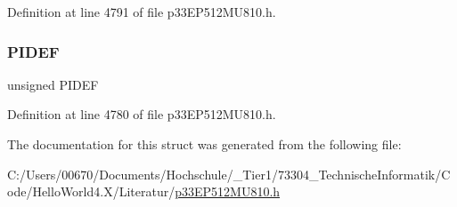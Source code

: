 Definition at line 4791 of file p33\+E\+P512\+M\+U810.\+h.

\mbox{\label{structtag_u1_e_i_r_b_i_t_s_ab25b04d497c6897c0e29ba709ddb08f1}} 
\subsubsection{\texorpdfstring{P\+I\+D\+EF}{PIDEF}}
{\footnotesize\ttfamily unsigned P\+I\+D\+EF}



Definition at line 4780 of file p33\+E\+P512\+M\+U810.\+h.



The documentation for this struct was generated from the following file\+:\begin{DoxyCompactItemize}
\item 
C\+:/\+Users/00670/\+Documents/\+Hochschule/\+\_\+\+Tier1/73304\+\_\+\+Technische\+Informatik/\+Code/\+Hello\+World4.\+X/\+Literatur/\hyperlink{p33_e_p512_m_u810_8h}{p33\+E\+P512\+M\+U810.\+h}\end{DoxyCompactItemize}
